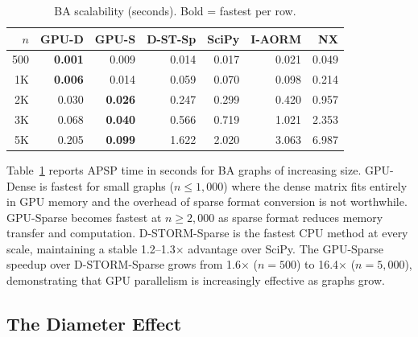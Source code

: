 \documentclass[journal]{IEEEtran}
\begin{document}
\begin{table}[t]
\centering
\caption{BA scalability (seconds). Bold = fastest per row.}
\label{tab:scale}
\setlength{\tabcolsep}{2pt}
\begin{tabular}{@{}rrrrrrr@{}}
\toprule
$n$ & \textbf{GPU-D} & \textbf{GPU-S} & \textbf{D-ST-Sp} & \textbf{SciPy} & \textbf{I-AORM} & \textbf{NX} \\
\midrule
500 & \textbf{0.001} & 0.009 & 0.014 & 0.017 & 0.021 & 0.049 \\
1K & \textbf{0.006} & 0.014 & 0.059 & 0.070 & 0.098 & 0.214 \\
2K & 0.030 & \textbf{0.026} & 0.247 & 0.299 & 0.420 & 0.957 \\
3K & 0.068 & \textbf{0.040} & 0.566 & 0.719 & 1.021 & 2.353 \\
5K & 0.205 & \textbf{0.099} & 1.622 & 2.020 & 3.063 & 6.987 \\
\bottomrule
\end{tabular}
\end{table}

Table~\ref{tab:scale} reports APSP time in seconds for BA graphs of increasing size. GPU-Dense is fastest for small graphs ($n \leq 1{,}000$) where the dense matrix fits entirely in GPU memory and the overhead of sparse format conversion is not worthwhile. GPU-Sparse becomes fastest at $n \geq 2{,}000$ as sparse format reduces memory transfer and computation. D-STORM-Sparse is the fastest CPU method at every scale, maintaining a stable 1.2--1.3$\times$ advantage over SciPy. The GPU-Sparse speedup over D-STORM-Sparse grows from 1.6$\times$ ($n=500$) to 16.4$\times$ ($n=5{,}000$), demonstrating that GPU parallelism is increasingly effective as graphs grow.


\subsection{The Diameter Effect}
\end{document}
